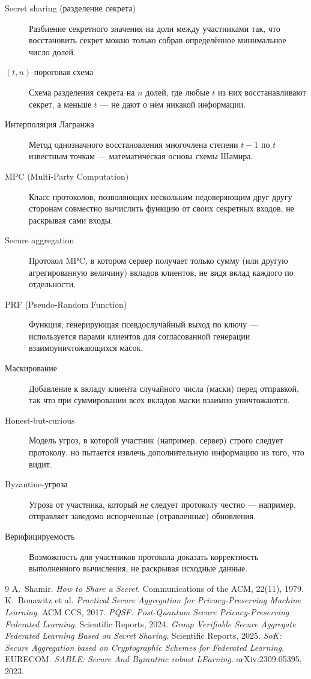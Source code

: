 \documentclass[11pt]{article}
\begin{document}
\begin{description}
  \item[Secret sharing (разделение секрета)] Разбиение секретного значения на доли
    между участниками так, что восстановить секрет можно только собрав определённое
    минимальное число долей.
  \item[$(t, n)$-пороговая схема] Схема разделения секрета на $n$ долей, где любые
    $t$ из них восстанавливают секрет, а меньше $t$ — не дают о нём никакой
    информации.
  \item[Интерполяция Лагранжа] Метод однозначного восстановления многочлена степени
    $t-1$ по $t$ известным точкам — математическая основа схемы Шамира.
  \item[MPC (Multi-Party Computation)] Класс протоколов, позволяющих нескольким
    недоверяющим друг другу сторонам совместно вычислить функцию от своих секретных
    входов, не раскрывая сами входы.
  \item[Secure aggregation] Протокол MPC, в котором сервер получает только сумму
    (или другую агрегированную величину) вкладов клиентов, не видя вклад каждого по
    отдельности.
  \item[PRF (Pseudo-Random Function)] Функция, генерирующая псевдослучайный выход по
    ключу — используется парами клиентов для согласованной генерации взаимоуничтожающихся
    масок.
  \item[Маскирование] Добавление к вкладу клиента случайного числа (маски) перед
    отправкой, так что при суммировании всех вкладов маски взаимно уничтожаются.
  \item[Honest-but-curious] Модель угроз, в которой участник (например, сервер)
    строго следует протоколу, но пытается извлечь дополнительную информацию из того,
    что видит.
  \item[Byzantine-угроза] Угроза от участника, который \emph{не} следует протоколу
    честно — например, отправляет заведомо испорченные (отравленные) обновления.
  \item[Верифицируемость] Возможность для участников протокола доказать корректность
    выполненного вычисления, не раскрывая исходные данные.
\end{description}

\begin{thebibliography}{9}
 A.~Shamir. \emph{How to Share a Secret}. Communications of the
  ACM, 22(11), 1979.
 K.~Bonawitz et al. \emph{Practical Secure Aggregation for
  Privacy-Preserving Machine Learning}. ACM CCS, 2017.
 \emph{PQSF: Post-Quantum Secure Privacy-Preserving Federated
  Learning}. Scientific Reports, 2024.
 \emph{Group Verifiable Secure Aggregate Federated
  Learning Based on Secret Sharing}. Scientific Reports, 2025.
 \emph{SoK: Secure Aggregation based on Cryptographic Schemes for
  Federated Learning}. EURECOM.
 \emph{SABLE: Secure And Byzantine robust LEarning}.
  arXiv:2309.05395, 2023.
\end{thebibliography}
\end{document}
